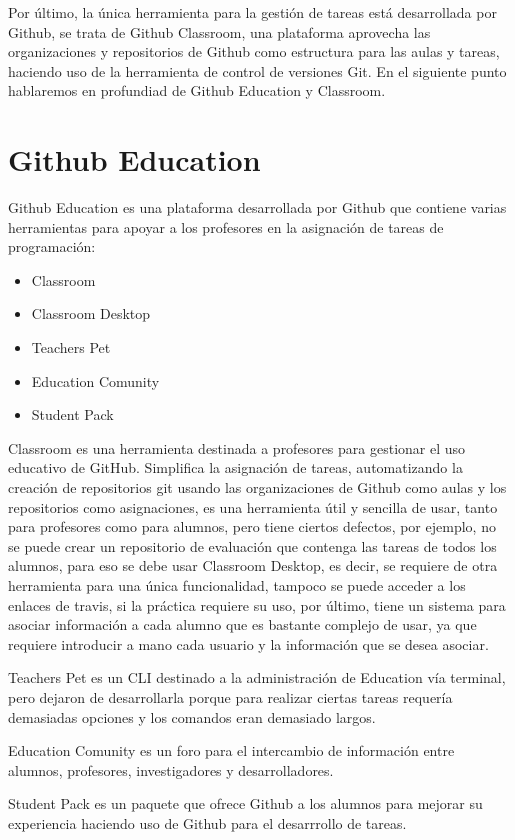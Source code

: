 Por último, la única herramienta para la gestión de tareas está desarrollada por Github, se trata de Github Classroom, una plataforma aprovecha las organizaciones y repositorios de Github como estructura para las aulas y tareas, haciendo uso de la herramienta de control de versiones Git. En el siguiente punto hablaremos en profundiad de Github Education y Classroom.


\section{Github Education}
\label{1:sec:2}

Github Education es una plataforma desarrollada por Github que contiene varias herramientas para apoyar a los profesores en la asignación de tareas de programación:

\begin{itemize}
  \item Classroom
  \item Classroom Desktop
  \item Teachers Pet  
  \item Education Comunity
  \item Student Pack
\end{itemize}

Classroom es una herramienta destinada a profesores para gestionar el uso educativo de GitHub. Simplifica la asignación de tareas, automatizando la creación de repositorios git usando las organizaciones de Github como aulas y los repositorios como asignaciones, es una herramienta útil y sencilla de usar, tanto para profesores como para alumnos, pero tiene ciertos defectos, por ejemplo, no se puede crear un repositorio de evaluación que contenga las tareas de todos los alumnos, para eso se debe usar Classroom Desktop, es decir, se requiere de otra herramienta para una única funcionalidad, tampoco se puede acceder a los enlaces de travis, si la práctica requiere su uso, por último, tiene un sistema para asociar información a cada alumno que es bastante complejo de usar, ya que requiere introducir a mano cada usuario y la información que se desea asociar.

Teachers Pet es un CLI destinado a la administración de Education vía terminal, pero dejaron de desarrollarla porque para realizar ciertas tareas requería demasiadas opciones y los comandos eran demasiado largos.

Education Comunity es un foro para el intercambio de información entre alumnos, profesores, investigadores y desarrolladores.

Student Pack es un paquete que ofrece Github a los alumnos para mejorar su experiencia haciendo uso de Github para el desarrrollo de tareas.
